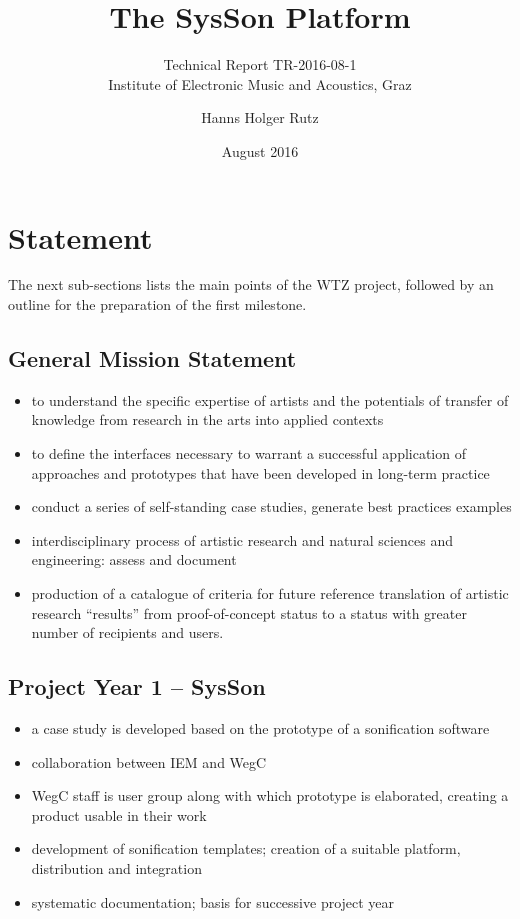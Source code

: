 \documentclass[11pt,a4paper]{article}
\title{The SysSon Platform}
\subtitle{Technical Report TR-2016-08-1\\Institute of Electronic Music and Acoustics, Graz}
\author{Hanns Holger Rutz}
\date{August 2016}
\begin{document}
\maketitle
{}
\thispagestyle{empty}
\newpage
\section{Statement}

The next sub-sections lists the main points of the WTZ project, followed by an outline for the preparation of the first milestone.

\subsection{General Mission Statement}

\begin{itemize}
\item to understand the specific expertise of artists and the potentials of transfer of knowledge from research in the arts into applied contexts
\item to define the interfaces necessary to warrant a successful application of approaches and prototypes that have been developed in long-term practice
\item conduct a series of self-standing case studies, generate best practices examples
\item interdisciplinary process of artistic research and natural sciences and engineering: assess and document
\item production of a catalogue of criteria for future reference
 translation of artistic research ``results'' from proof-of-concept status to a status with greater number of recipients and users.
\end{itemize}

\subsection{Project Year 1 -- SysSon}

\begin{itemize}
\item a case study is developed based on the prototype of a sonification software
\item collaboration between IEM and WegC
\item WegC staff is user group along with which prototype is elaborated, creating a product usable in their work
\item development of sonification templates; creation of a suitable platform, distribution and integration
\item systematic documentation; basis for successive project year
\end{itemize}
\end{document}
